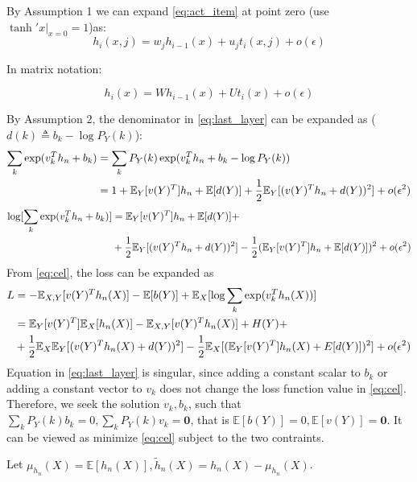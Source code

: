 \documentclass{article}
\def\E{\mathbb{E}}
\begin{document}
By Assumption 1 we can expand \eqref{eq:act_item} 
at point zero (use $\tanh' x \vert_{x=0} =1$)as:
$$
h_i(x,j) = w_j h_{i-1}(x) + u_j t_i(x,j) + o(\epsilon)
$$

In matrix notation:

\begin{equation}\label{eq:matrix_step}
h_i(x)=W h_{i-1}(x) + U t_i(x) + o(\epsilon)
\end{equation}

By Assumption 2, the denominator in \eqref{eq:last_layer} can be expanded as ($d(k)\triangleq b_k-\log P_Y(k)$):
\begin{align*}
\sum_{k} \exp(v_k^T h_n + b_k) & = \sum_{k} P_Y(k) \exp(v_k^T h_n + b_k-\log P_Y(k))\\
& = 1 + \E_Y[v(Y)^T] h_n + \E[d(Y)] + {1\over 2}\E_Y[(v(Y)^T h_n+d(Y))^2] + o(\epsilon^2)
\end{align*}
\begin{equation*}
\begin{split}
\log [\sum_{k} \exp(v_k^T h_n + b_k)]  & =    \E_Y[v(Y)^T]h_n  + \E[d(Y)] +\\
& + {1\over 2}\E_Y[(v(Y)^T h_n + d(Y))^2] -{1\over 2}(\E_Y[v(Y)^T]h_n+\E[d(Y)])^2 + o(\epsilon^2)
\end{split}
\end{equation*}
From \eqref{eq:cel}, the loss can be expanded as
\begin{align*}
L & = -\E_{X,Y}[v(Y)^Th_n(X)] -\E[b(Y)]+ \E_X [\log \sum_{k} \exp(v_k^T h_n(X))] \\
& = \E_Y[v(Y)^T]\E_X[h_n(X)]-\E_{X,Y}[v(Y)^Th_n(X)] + H(Y) + \\
& +\frac{1}{2}\E_{X}\E_Y[(v(Y)^T h_n(X)+d(Y))^2]-{1\over 2}\E_X[(\E_Y[v(Y)^T]h_n(X)+E[d(Y)])^2] + o(\epsilon^2) \\
\end{align*}
Equation in \eqref{eq:last_layer} is singular, since adding a constant scalar to $b_k$ or adding a constant vector to $v_k$ does not change the loss function value in \eqref{eq:cel}.
Therefore, we seek the solution $v_k, b_k$, such that $\sum_{k}P_Y(k)b_k=0,\sum_{k}P_Y(k) v_k=\bm{0}$, that is $\E[b(Y)]=0,\E[v(Y)]=\bm{0}$. It can be viewed as minimize \eqref{eq:cel} subject to the two contraints. 

Let $\mu_{h_n}(X)=\E[h_n(X)],\widetilde{h}_n(X)=h_n(X)-\mu_{h_n}(X)$.
\end{document}
